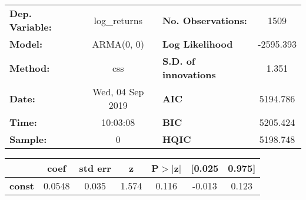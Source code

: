 \begin{center}
\begin{tabular}{lclc}
\toprule
\textbf{Dep. Variable:} &   log\_returns   & \textbf{  No. Observations:  } &    1509     \\
\textbf{Model:}         &    ARMA(0, 0)    & \textbf{  Log Likelihood     } & -2595.393   \\
\textbf{Method:}        &       css        & \textbf{  S.D. of innovations} &   1.351     \\
\textbf{Date:}          & Wed, 04 Sep 2019 & \textbf{  AIC                } &  5194.786   \\
\textbf{Time:}          &     10:03:08     & \textbf{  BIC                } &  5205.424   \\
\textbf{Sample:}        &        0         & \textbf{  HQIC               } &  5198.748   \\
\bottomrule
\end{tabular}
\begin{tabular}{lcccccc}
               & \textbf{coef} & \textbf{std err} & \textbf{z} & \textbf{P$> |$z$|$} & \textbf{[0.025} & \textbf{0.975]}  \\
\midrule
\textbf{const} &       0.0548  &        0.035     &     1.574  &         0.116        &       -0.013    &        0.123     \\
\bottomrule
\end{tabular}
\end{center}
